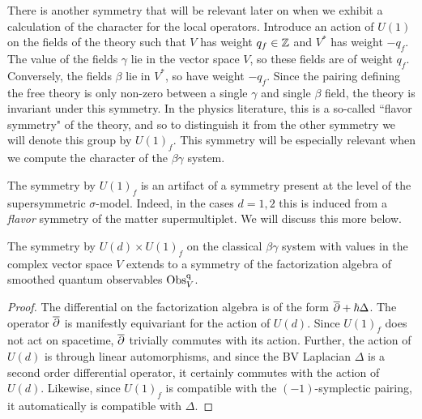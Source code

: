 There is another symmetry that will be relevant later on when we exhibit a calculation of the character for the local operators.
Introduce an action of $U(1)$ on the fields of the theory such that $V$ has weight $q_f \in \mathbb Z$ and $V^*$ has weight $-q_f$.
The value of the fields $\gamma$ lie in the vector space $V$, so these fields are of weight $q_f$. 
Conversely, the fields $\beta$ lie in $V^*$, so have weight $-q_f$.
Since the pairing defining the free theory is only non-zero between a single $\gamma$ and single $\beta$ field, the theory is invariant under this symmetry.
In the physics literature, this is a so-called ``flavor symmetry" of the theory, and so to distinguish it from the other symmetry we will denote this group by $U(1)_f$. 
This symmetry will be especially relevant when we compute the character of the $\beta \gamma$ system.

\begin{rmk}
The symmetry by $U(1)_f$ is an artifact of a symmetry present at the level of the supersymmetric $\sigma$-model.
Indeed, in the cases $d=1,2$ this is induced from a {\em flavor} symmetry of the matter supermultiplet.
We will discuss this more below.
\end{rmk}

\begin{lem}\label{lem U(d) equivariance}  The symmetry by $U(d) \times U(1)_f$ on the classical $\beta\gamma$ system with values in the complex vector space $V$ extends to a symmetry of the factorization algebra of smoothed quantum observables ${\rm Obs}^{{\rm q}}_V$.
\end{lem}

\begin{proof}
The differential on the factorization algebra is of the form $\overline{\partial} + \hbar \Delta$. 
The operator $\overline{\partial}$ is manifestly equivariant for the action of $U(d)$.
Since $U(1)_f$ does not act on spacetime, $\overline{\partial}$ trivially commutes with its action. Further, the action of $U(d)$ is through linear automorphisms, and since the BV Laplacian $\Delta$ is a second order differential operator, it certainly commutes with the action of $U(d)$. 
Likewise, since $U(1)_f$ is compatible with the $(-1)$-symplectic pairing, it automatically is compatible with $\Delta$. 
\end{proof}

